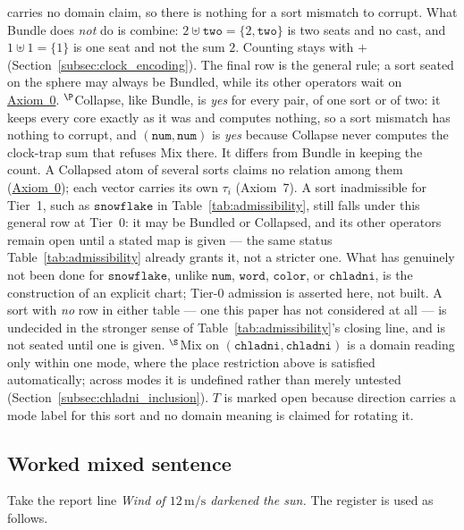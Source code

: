 \documentclass[12pt, a4paper]{article}
\begin{document}
\begin{table}[h]
{carries no domain claim, so there is nothing for a sort mismatch to
corrupt. What Bundle does \emph{not} do is combine: $2\uplus
\texttt{two}=\{2,\texttt{two}\}$ is two seats and no cast, and
$1\uplus 1=\{1\}$ is one seat and not the sum $2$. Counting stays with
$+$ (Section~\ref{subsec:clock_encoding}). The final row is the
general rule; a sort seated on the sphere may always be Bundled, while
its other operators wait on
\hyperref[subsec:axiom0_admissibility]{Axiom~0}.
$^{\P}$Collapse, like Bundle, is \emph{yes} for every pair, of one sort or of two: it keeps every core exactly as it was and computes nothing, so a sort mismatch has nothing to corrupt, and $(\mathtt{num},\mathtt{num})$ is \emph{yes} because Collapse never computes the clock-trap sum that refuses Mix there. It differs from Bundle in keeping the count. A Collapsed atom of several sorts claims no relation among them (\hyperref[subsec:axiom0_admissibility]{Axiom~0}); each vector carries its own $\tau_i$ (Axiom~7). A sort inadmissible for
Tier~1, such as $\mathtt{snowflake}$ in
Table~\ref{tab:admissibility}, still falls under this general row at
Tier~0: it may be Bundled or Collapsed, and its other operators remain open until
a stated map is given --- the same status Table~\ref{tab:admissibility}
already grants it, not a stricter one. What has genuinely not been
done for $\mathtt{snowflake}$, unlike $\mathtt{num}$, $\mathtt{word}$,
$\mathtt{color}$, or $\mathtt{chladni}$, is the construction of an
explicit chart; Tier-0 admission is asserted here, not built. A sort
with \emph{no} row in either table --- one this paper has not
considered at all --- is undecided in the stronger sense of
Table~\ref{tab:admissibility}'s closing line, and is not seated until
one is given.
$^{\S}$Mix on $(\mathtt{chladni},\mathtt{chladni})$ is a domain
reading only within one mode, where the place restriction above is
satisfied automatically; across modes it is undefined rather than
merely untested (Section~\ref{subsec:chladni_inclusion}). $T$ is
marked open because direction carries a mode label for this sort and
no domain meaning is claimed for rotating it.}
\label{tab:type_table}
\end{table}

\subsection{Worked mixed sentence}
\label{subsec:mixed_sentence}
Take the report line \emph{Wind of $12\,\mathrm{m/s}$ darkened the sun.}
The register is used as follows.
\end{document}

